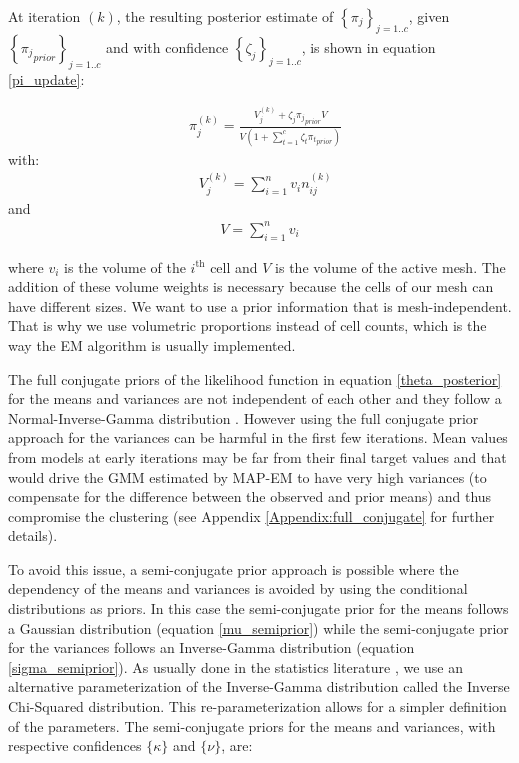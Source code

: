 \documentclass[extra]{gji} %
\begin{document}
At iteration $(k)$, the resulting posterior estimate of $\left\{\pi_j\right\}_{j=1..c}$, given $\left\{{\pi_j}_{prior}\right\}_{j=1..c}$ and with confidence $\left\{\zeta_j\right\}_{j=1..c}$, is shown in equation \ref{pi_update}:

\begin{align}
&\pi^{(k)}_j = \frac{V_{j}^{(k)}+\zeta_j {\pi_j}_{prior}V}{V(1+\sum_{t=1}^c \zeta_t {\pi_t}_{prior})} \label{pi_update}
\end{align}
with:
\begin{align}
&V_{j}^{(k)} = \sum^n_{i=1} v_i n_{ij}^{(k)} \label{VolumeProportions}
\end{align}
and
\begin{align}
V=\sum^n_{i=1} v_i
\end{align}

where $v_i$ is the volume of the $i^\text{th}$ cell and $V$ is the volume of the active mesh. The addition of these volume weights is necessary because the cells of our mesh can have different sizes. We want to use a prior information that is mesh-independent. That is why we use volumetric proportions instead of cell counts, which is the way the EM algorithm is usually implemented.

The full conjugate priors of the likelihood function in equation \ref{theta_posterior} for the means and variances are not independent of each other and they follow a Normal-Inverse-Gamma distribution \citep{Murphy:2012:MLP:2380985}. However using the full conjugate prior approach for the variances can be harmful in the first few iterations. Mean values from models at early iterations may be far from their final target values and that would drive the GMM estimated by MAP-EM to have very high variances (to compensate for the difference between the observed and prior means) and thus compromise the clustering (see Appendix \ref{Appendix:full_conjugate} for further details).

To avoid this issue, a semi-conjugate prior approach is possible where the dependency of the means and variances is avoided by using the conditional distributions as priors. In this case the semi-conjugate prior for the means follows a Gaussian distribution (equation \ref{mu_semiprior}) while the semi-conjugate prior for the variances follows an Inverse-Gamma distribution (equation \ref{sigma_semiprior}). As usually done in the statistics literature \citep{Murphy:2012:MLP:2380985}, we use an alternative parameterization of the Inverse-Gamma distribution called the Inverse Chi-Squared distribution. This re-parameterization allows for a simpler definition of the parameters. The semi-conjugate priors for the means and variances, with respective confidences $\{\kappa\}$ and $\{\nu\}$, are:
\end{document}
